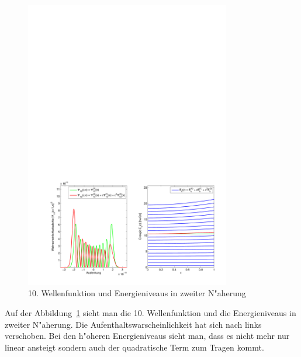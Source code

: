 \begin{refsection}
\begin{figure}[h]	%
\centering
\includegraphics[width=0.8\textwidth]{anharmonisch/images/x3/Stoerung2Wellenfunktion.pdf}
\caption{10. Wellenfunktion und Energieniveaus in zweiter N"aherung
\label{skript:x3_Stoerung1Wellenfunktion}}
\end{figure}

Auf der Abbildung~\ref{skript:x3_Stoerung1Wellenfunktion} sieht man die 10. Wellenfunktion und die Energieniveaus in zweiter N"aherung. Die Aufenthaltswarscheinlichkeit hat sich nach links verschoben. Bei den h"oheren Energieniveaus sieht man, dass es nicht mehr nur linear ansteigt sondern auch der quadratische Term zum Tragen kommt.


\end{refsection}
